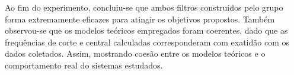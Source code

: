 Ao fim do experimento, concluiu-se que ambos filtros construídos pelo grupo forma extremamente eficazes para atingir os objetivos propostos. Também observou-se que os modelos teóricos empregados foram coerentes, dado que as frequências de corte e central calculadas corresponderam com exatidão com os dados coletados. Assim, mostrando coesão entre os modelos teóricos e o comportamento real do sistemas estudados. 